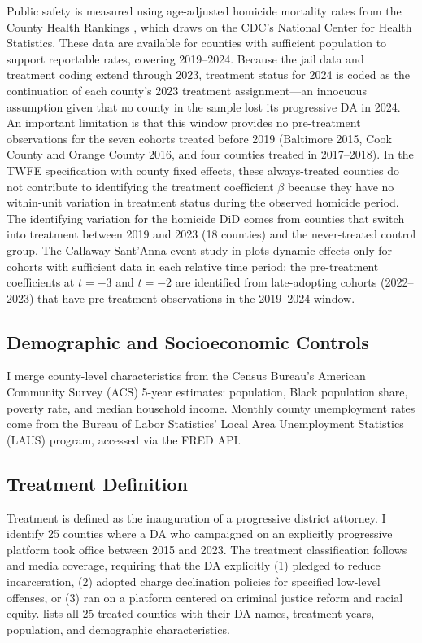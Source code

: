 \documentclass[12pt]{article}
\begin{document}
Public safety is measured using age-adjusted homicide mortality rates from the County Health Rankings \citep{chr2024}, which draws on the CDC's National Center for Health Statistics. These data are available for counties with sufficient population to support reportable rates, covering 2019--2024. Because the jail data and treatment coding extend through 2023, treatment status for 2024 is coded as the continuation of each county's 2023 treatment assignment---an innocuous assumption given that no county in the sample lost its progressive DA in 2024. An important limitation is that this window provides no pre-treatment observations for the seven cohorts treated before 2019 (Baltimore 2015, Cook County and Orange County 2016, and four counties treated in 2017--2018). In the TWFE specification with county fixed effects, these always-treated counties do not contribute to identifying the treatment coefficient $\beta$ because they have no within-unit variation in treatment status during the observed homicide period. The identifying variation for the homicide DiD comes from counties that switch into treatment between 2019 and 2023 (18 counties) and the never-treated control group. The Callaway-Sant'Anna event study in  plots dynamic effects only for cohorts with sufficient data in each relative time period; the pre-treatment coefficients at $t = -3$ and $t = -2$ are identified from late-adopting cohorts (2022--2023) that have pre-treatment observations in the 2019--2024 window.

\subsection{Demographic and Socioeconomic Controls}

I merge county-level characteristics from the Census Bureau's American Community Survey (ACS) 5-year estimates: population, Black population share, poverty rate, and median household income. Monthly county unemployment rates come from the Bureau of Labor Statistics' Local Area Unemployment Statistics (LAUS) program, accessed via the FRED API.

\subsection{Treatment Definition}

Treatment is defined as the inauguration of a progressive district attorney. I identify 25 counties where a DA who campaigned on an explicitly progressive platform took office between 2015 and 2023. The treatment classification follows \citet{baumer2022da} and media coverage, requiring that the DA explicitly (1) pledged to reduce incarceration, (2) adopted charge declination policies for specified low-level offenses, or (3) ran on a platform centered on criminal justice reform and racial equity.  lists all 25 treated counties with their DA names, treatment years, population, and demographic characteristics.
\end{document}
